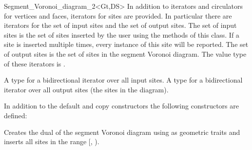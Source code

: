 \begin{ccRefClass}{Segment_Voronoi_diagram_2<Gt,DS>}
In addition to iterators and circulators for vertices and faces,
iterators for sites are provided. In particular there are iterators
for the set of input sites and the set of output sites. The set of
input sites is the set of sites inserted by the user using the
 methods of this class. If a site is inserted multiple
times, every instance of this site will be reported. The set of output
sites is the set of sites in the segment Voronoi diagram. The value
type of these iterators is .

{}
{A type for a bidirectional iterator over all input sites.}
\ccGlue
{}
{A type for a bidirectional iterator over all output sites (the sites
  in the diagram).}


\ccCreation
{}
\ccThreeToTwo
%

In addition to the default and copy constructors the following
constructors are defined:

%
{Creates the dual of the segment Voronoi diagram using  as
geometric traits and inserts all sites in the range
[, ).
}
%





\end{ccRefClass}
